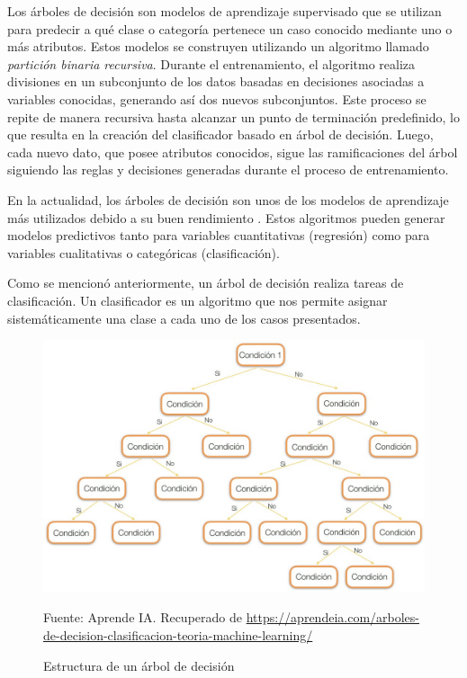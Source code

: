 Los árboles de decisión son modelos de aprendizaje supervisado que se utilizan para predecir a qué clase o categoría pertenece un caso conocido mediante uno o más atributos. Estos modelos se construyen utilizando un algoritmo llamado \emph{partición binaria recursiva}. Durante el entrenamiento, el algoritmo realiza divisiones en un subconjunto de los datos basadas en decisiones asociadas a variables conocidas, generando así dos nuevos subconjuntos. Este proceso se repite de manera recursiva hasta alcanzar un punto de terminación predefinido, lo que resulta en la creación del clasificador basado en árbol de decisión. Luego, cada nuevo dato, que posee atributos conocidos, sigue las ramificaciones del árbol siguiendo las reglas y decisiones generadas durante el proceso de entrenamiento.

En la actualidad, los árboles de decisión son unos de los modelos de aprendizaje más utilizados debido a su buen rendimiento \cite{arboles-decision}. Estos algoritmos pueden generar modelos predictivos tanto para variables cuantitativas (regresión) como para variables cualitativas o categóricas (clasificación).

Como se mencionó anteriormente, un árbol de decisión realiza tareas de clasificación. Un clasificador es un algoritmo que nos permite asignar sistemáticamente una clase a cada uno de los casos presentados.

\begin{figure}[H]
    \begin{minipage}[t]{0.9\textwidth}
        \caption{Estructura de un árbol de decisión}
        \label{arbol-de-decision}        
    \end{minipage}

    \vspace{10pt}

    \begin{minipage}[b]{1.1\textwidth}
        \centering
        \includegraphics[width=\textwidth]{img/estructura-arbol-de-decision.jpg}        
    \end{minipage}

    \begin{minipage}[t]{0.9\textwidth}
        Fuente: Aprende IA. Recuperado de \url{https://aprendeia.com/arboles-de-decision-clasificacion-teoria-machine-learning/}
    \end{minipage}
\end{figure}

